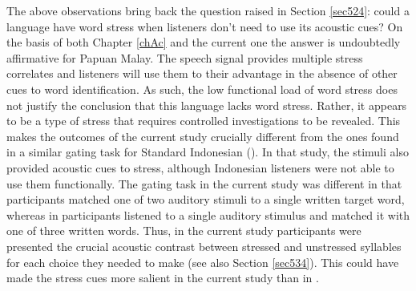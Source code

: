 The above observations bring back the question raised in Section \ref{sec524}: could a language have word stress when listeners don’t need to use its acoustic cues? On the basis of both Chapter \ref{chAc} and the current one the answer is undoubtedly affirmative for Papuan Malay. The speech signal provides multiple stress correlates and listeners will use them to their advantage in the absence of other cues to word identification. As such, the low functional load of word stress does not justify the conclusion that this language lacks word stress. Rather, it appears to be a type of stress that requires controlled investigations to be revealed. This makes the outcomes of the current study crucially different from the ones found in a similar gating task for Standard Indonesian (\citealt{vanzanten_word_1998}). In that study, the stimuli also provided acoustic cues to stress, although Indonesian listeners were not able to use them functionally. The gating task in the current study was different in that participants matched one of two auditory stimuli to a single written target word, whereas in \citet{vanzanten_word_1998} participants listened to a single auditory stimulus and matched it with one of three written words. Thus, in the current study participants were presented the crucial acoustic contrast between stressed and unstressed syllables for each choice they needed to make (see also Section \ref{sec534}). This could have made the stress cues more salient in the current study than in \citet{vanzanten_word_1998}. \par

